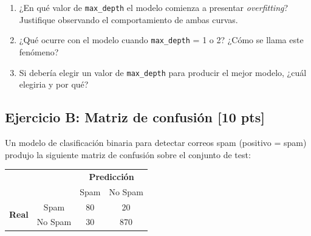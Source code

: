 \documentclass[11pt,a4paper]{article}
\newcommand{\puntaje}[1]{\textbf{[#1 pts]}}
\begin{document}
\vspace{0.3cm}

\begin{enumerate}[label=\textbf{\alph*)}]
  \item ¿En qu\'e valor de \texttt{max\_depth} el modelo comienza a presentar \textit{overfitting}? Justifique observando el comportamiento de ambas curvas.

  \vspace{2.5cm}

  \item ¿Qu\'e ocurre con el modelo cuando \texttt{max\_depth} = 1 o 2? ¿C\'omo se llama este fen\'omeno?

  \vspace{2.5cm}

  \item Si deber\'ia elegir un valor de \texttt{max\_depth} para producir el mejor modelo, ¿cu\'al elegiria y por qu\'e?

  \vspace{2.5cm}
\end{enumerate}

\subsection*{Ejercicio B: Matriz de confusi\'on \puntaje{10}}

Un modelo de clasificaci\'on binaria para detectar correos spam (positivo = spam) produjo la siguiente matriz de confusi\'on sobre el conjunto de test:

\vspace{0.3cm}
\begin{center}
\begin{tabular}{cc|cc}
  & & \multicolumn{2}{c}{\textbf{Predicci\'on}} \\
  & & Spam & No Spam \\
  \hline
  \multirow{2}{*}{\textbf{Real}} & Spam    & 80  & 20  \\
                                  & No Spam & 30  & 870 \\
\end{tabular}
\end{center}

\vspace{0.3cm}
\end{document}
